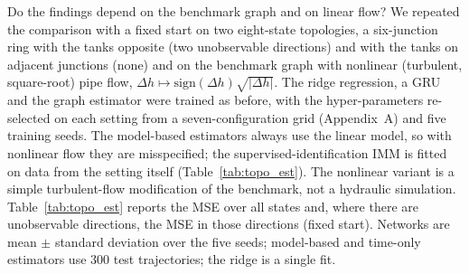 \documentclass[conference]{IEEEtran}
\begin{document}
Do the findings depend on the benchmark graph and on linear flow? We repeated the comparison with a fixed start on two eight-state topologies, a six-junction ring with the tanks opposite (two unobservable directions) and with the tanks on adjacent junctions (none) and on the benchmark graph with nonlinear (turbulent, square-root) pipe flow, $\Delta h\mapsto\mathrm{sign}(\Delta h)\sqrt{|\Delta h|}$. The ridge regression, a GRU and the graph estimator were trained as before, with the hyper-parameters re-selected on each setting from a seven-configuration grid (Appendix~A) and five training seeds. The model-based estimators always use the linear model, so with nonlinear flow they are misspecified; the supervised-identification IMM is fitted on data from the setting itself (Table~\ref{tab:topo_est}). The nonlinear variant is a simple turbulent-flow modification of the benchmark, not a hydraulic simulation. Table~\ref{tab:topo_est} reports the MSE over all states and, where there are unobservable directions, the MSE in those directions (fixed start). Networks are mean $\pm$ standard deviation over the five seeds; model-based and time-only estimators use 300 test trajectories; the ridge is a single fit.

\begin{table}[t]
\centering
\caption{Estimators on other topologies and with nonlinear flow.}
\label{tab:topo_est}
\small
{}
\end{table}
\end{document}
